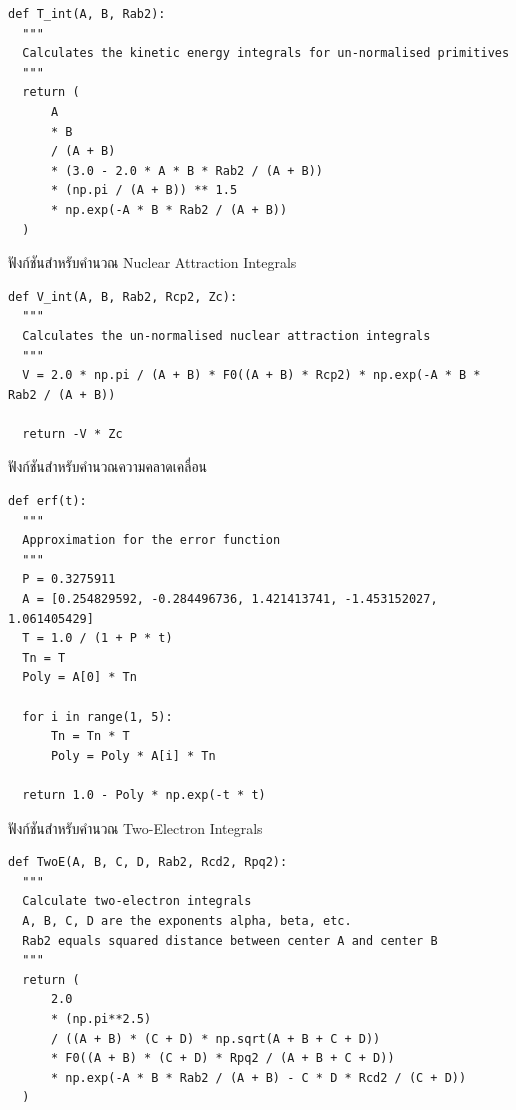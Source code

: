 \vspace{5pt}

\begin{lstlisting}[style=MyPython]
def T_int(A, B, Rab2):
  """
  Calculates the kinetic energy integrals for un-normalised primitives
  """
  return (
      A
      * B
      / (A + B)
      * (3.0 - 2.0 * A * B * Rab2 / (A + B))
      * (np.pi / (A + B)) ** 1.5
      * np.exp(-A * B * Rab2 / (A + B))
  )
\end{lstlisting}

\vspace{5pt}

\noindent ฟังก์ชันสำหรับคำนวณ Nuclear Attraction Integrals

\vspace{5pt}

\begin{lstlisting}[style=MyPython]
def V_int(A, B, Rab2, Rcp2, Zc):
  """
  Calculates the un-normalised nuclear attraction integrals
  """
  V = 2.0 * np.pi / (A + B) * F0((A + B) * Rcp2) * np.exp(-A * B * Rab2 / (A + B))

  return -V * Zc
\end{lstlisting}

\vspace{5pt}

\noindent ฟังก์ชันสำหรับคำนวณความคลาดเคลื่อน

\vspace{5pt}

\begin{lstlisting}[style=MyPython]
def erf(t):
  """
  Approximation for the error function
  """
  P = 0.3275911
  A = [0.254829592, -0.284496736, 1.421413741, -1.453152027, 1.061405429]
  T = 1.0 / (1 + P * t)
  Tn = T
  Poly = A[0] * Tn

  for i in range(1, 5):
      Tn = Tn * T
      Poly = Poly * A[i] * Tn

  return 1.0 - Poly * np.exp(-t * t)
\end{lstlisting}

\vspace{5pt}

\noindent ฟังก์ชันสำหรับคำนวณ Two-Electron Integrals
\vspace{5pt}

\begin{lstlisting}[style=MyPython]
def TwoE(A, B, C, D, Rab2, Rcd2, Rpq2):
  """
  Calculate two-electron integrals
  A, B, C, D are the exponents alpha, beta, etc.
  Rab2 equals squared distance between center A and center B
  """
  return (
      2.0
      * (np.pi**2.5)
      / ((A + B) * (C + D) * np.sqrt(A + B + C + D))
      * F0((A + B) * (C + D) * Rpq2 / (A + B + C + D))
      * np.exp(-A * B * Rab2 / (A + B) - C * D * Rcd2 / (C + D))
  )
\end{lstlisting}

